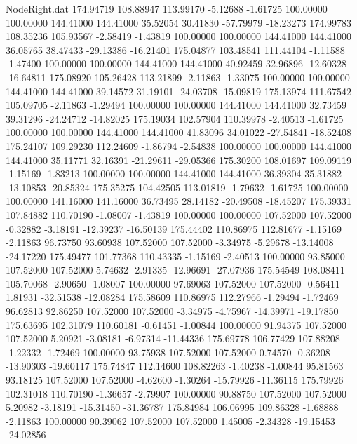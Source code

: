 \begin{filecontents}{NodeRight.dat}
 174.94719  108.88947  113.99170    -5.12688   -1.61725  100.00000  100.00000  144.41000  144.41000   35.52054   30.41830  -57.79979  -18.23273
 174.99783  108.35236  105.93567    -2.58419   -1.43819  100.00000  100.00000  144.41000  144.41000   36.05765   38.47433  -29.13386  -16.21401
 175.04877  103.48541  111.44104    -1.11588   -1.47400  100.00000  100.00000  144.41000  144.41000   40.92459   32.96896  -12.60328  -16.64811
 175.08920  105.26428  113.21899    -2.11863   -1.33075  100.00000  100.00000  144.41000  144.41000   39.14572   31.19101  -24.03708  -15.09819
 175.13974  111.67542  105.09705    -2.11863   -1.29494  100.00000  100.00000  144.41000  144.41000   32.73459   39.31296  -24.24712  -14.82025
 175.19034  102.57904  110.39978    -2.40513   -1.61725  100.00000  100.00000  144.41000  144.41000   41.83096   34.01022  -27.54841  -18.52408
 175.24107  109.29230  112.24609    -1.86794   -2.54838  100.00000  100.00000  144.41000  144.41000   35.11771   32.16391  -21.29611  -29.05366
 175.30200  108.01697  109.09119    -1.15169   -1.83213  100.00000  100.00000  144.41000  144.41000   36.39304   35.31882  -13.10853  -20.85324
 175.35275  104.42505  113.01819    -1.79632   -1.61725  100.00000  100.00000  141.16000  141.16000   36.73495   28.14182  -20.49508  -18.45207
 175.39331  107.84882  110.70190    -1.08007   -1.43819  100.00000  100.00000  107.52000  107.52000   -0.32882   -3.18191  -12.39237  -16.50139
 175.44402  110.86975  112.81677    -1.15169   -2.11863   96.73750   93.60938  107.52000  107.52000   -3.34975   -5.29678  -13.14008  -24.17220
 175.49477  101.77368  110.43335    -1.15169   -2.40513  100.00000   93.85000  107.52000  107.52000    5.74632   -2.91335  -12.96691  -27.07936
 175.54549  108.08411  105.70068    -2.90650   -1.08007  100.00000   97.69063  107.52000  107.52000   -0.56411    1.81931  -32.51538  -12.08284
 175.58609  110.86975  112.27966    -1.29494   -1.72469   96.62813   92.86250  107.52000  107.52000   -3.34975   -4.75967  -14.39971  -19.17850
 175.63695  102.31079  110.60181    -0.61451   -1.00844  100.00000   91.94375  107.52000  107.52000    5.20921   -3.08181   -6.97314  -11.44336
 175.69778  106.77429  107.88208    -1.22332   -1.72469  100.00000   93.75938  107.52000  107.52000    0.74570   -0.36208  -13.90303  -19.60117
 175.74847  112.14600  108.82263    -1.40238   -1.00844   95.81563   93.18125  107.52000  107.52000   -4.62600   -1.30264  -15.79926  -11.36115
 175.79926  102.31018  110.70190    -1.36657   -2.79907  100.00000   90.88750  107.52000  107.52000    5.20982   -3.18191  -15.31450  -31.36787
 175.84984  106.06995  109.86328    -1.68888   -2.11863  100.00000   90.39062  107.52000  107.52000    1.45005   -2.34328  -19.15453  -24.02856

\end{filecontents}
